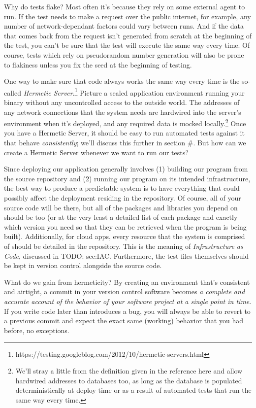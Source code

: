 \documentclass{article}
\newcommand{\noterm}[1]{\textit{#1}}
\newcommand{\term}[1]{\noterm{#1}\index{#1}}
\begin{document}
Why do tests flake?
Most often it's because they rely on some external agent to run.
If the test needs to make a request over the public internet, for example, any number of network-dependant factors could vary between runs.
And if the data that comes back from the request isn't generated from scratch at the beginning of the test, you can't be sure that the test will execute the same way every time.
Of course, tests which rely on pseudorandom number generation will also be prone to flakiness unless you fix the seed at the beginning of testing.

One way to make sure that code always works the same way every time is the so-called \term{Hermetic Server}.\footnote{https://testing.googleblog.com/2012/10/hermetic-servers.html}
Picture a sealed application environment running your binary without any uncontrolled access to the outside world.
The addresses of any network connections that the system needs are hardwired into the server's environment when it's deployed, and any required data is mocked locally.\footnote{
  We'll stray a little from the definition given in the reference here and allow hardwired addresses to databases too, as long as the database is populated deterministically at deploy time or as a result of automated tests that run the same way every time.
}
Once you have a Hermetic Server, it should be easy to run automated tests against it that behave \term{consistently}; we'll discuss this further in section \#.
But how can we create a Hermetic Server whenever we want to run our tests?

Since deploying our application generally involves (1) building our program from the source repository and (2) running our program on its intended infrastructure, the best way to produce a predictable system is to have everything that could possibly affect the deployment residing in the repository.
Of course, all of your source code will be there, but all of the packages and libraries you depend on should be too (or at the very least a detailed list of each package and exactly which version you need so that they can be retrieved when the program is being built).
Additionally, for cloud apps, every resource that the system is comprised of should be detailed in the repository.
This is the meaning of \term{Infrastructure as Code}, discussed in TODO: sec:IAC.
Furthermore, the test files themselves should be kept in version control alongside the source code.

What do we gain from hermeticity?
By creating an environment that's consistent and airtight, a commit in your version control software becomes \textit{a complete and accurate account of the behavior of your software project at a single point in time}.
If you write code later than introduces a bug, you will always be able to revert to a previous commit and expect the exact same (working) behavior that you had before, no exceptions.
\end{document}
